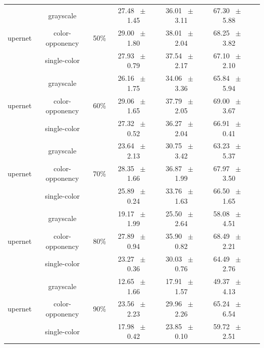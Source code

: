\begin{table}[h]
\begin{tabular}{@{}lccc ccc@{}}
    \midrule
    \multirow{3}{*}{upernet} & grayscale & \multirow{3}{*}{50\%} & 27.48 ~$\pm$~ 1.45 & 36.01 ~$\pm$~ 3.11 & 67.30 ~$\pm$~ 5.88 \\
    & color-opponency &  & 29.00 ~$\pm$~ 1.80 & 38.01 ~$\pm$~ 2.04 & 68.25 ~$\pm$~ 3.82 \\
    & single-color &  & 27.93 ~$\pm$~ 0.79 & 37.54 ~$\pm$~ 2.17 & 67.10 ~$\pm$~ 2.10 \\
    \midrule
    \multirow{3}{*}{upernet} & grayscale & \multirow{3}{*}{60\%} & 26.16 ~$\pm$~ 1.75 & 34.06 ~$\pm$~ 3.36 & 65.84 ~$\pm$~ 5.94 \\
    & color-opponency &  & 29.06 ~$\pm$~ 1.65 & 37.79 ~$\pm$~ 2.05 & 69.00 ~$\pm$~ 3.67 \\
    & single-color &  & 27.32 ~$\pm$~ 0.52 & 36.27 ~$\pm$~ 2.04 & 66.91 ~$\pm$~ 0.41 \\
    \midrule
    \multirow{3}{*}{upernet} & grayscale & \multirow{3}{*}{70\%} & 23.64 ~$\pm$~ 2.13 & 30.75 ~$\pm$~ 3.42 & 63.23 ~$\pm$~ 5.37 \\
    & color-opponency &  & 28.35 ~$\pm$~ 1.66 & 36.87 ~$\pm$~ 1.99 & 67.97 ~$\pm$~ 3.50 \\
    & single-color &  & 25.89 ~$\pm$~ 0.24 & 33.76 ~$\pm$~ 1.63 & 66.50 ~$\pm$~ 1.65 \\
    \midrule
    \multirow{3}{*}{upernet} & grayscale & \multirow{3}{*}{80\%} & 19.17 ~$\pm$~ 1.99 & 25.50 ~$\pm$~ 2.64 & 58.08 ~$\pm$~ 4.51 \\
    & color-opponency &  & 27.89 ~$\pm$~ 0.94 & 35.90 ~$\pm$~ 0.82 & 68.49 ~$\pm$~ 2.21 \\
    & single-color &  & 23.27 ~$\pm$~ 0.36 & 30.03 ~$\pm$~ 0.76 & 64.49 ~$\pm$~ 2.76 \\
    \midrule
    \multirow{3}{*}{upernet} & grayscale & \multirow{3}{*}{90\%} & 12.65 ~$\pm$~ 1.66 & 17.91 ~$\pm$~ 1.57 & 49.37 ~$\pm$~ 4.13 \\
    & color-opponency &  & 23.56 ~$\pm$~ 2.23 & 29.96 ~$\pm$~ 2.26 & 65.24 ~$\pm$~ 6.54 \\
    & single-color &  & 17.98 ~$\pm$~ 0.42 & 23.85 ~$\pm$~ 0.10 & 59.72 ~$\pm$~ 2.51 \\
    \midrule
    \bottomrule
  \end{tabular}
  \label{tab:sparse_results_upernet_acdc_full}
\end{table}